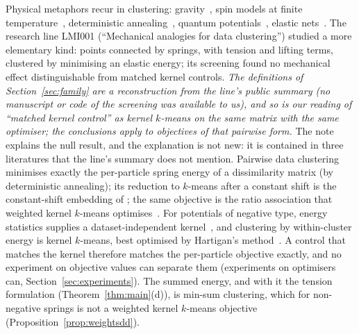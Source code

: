 \documentclass[11pt,a4paper]{article}
\theoremstyle{plain}
\theoremstyle{definition}
\theoremstyle{remark}
\begin{document}
Physical metaphors recur in clustering: gravity~\citep{wright1977}, spin models at finite temperature~\citep{blatt1996}, deterministic annealing~\citep{rose1990,rose1998}, quantum potentials~\citep{horn2002}, elastic nets~\citep{durbin1987,yuille1990}. The research line LMI001 (``Mechanical analogies for data clustering'') studied a more elementary kind: points connected by springs, with tension and lifting terms, clustered by minimising an elastic energy; its screening found no mechanical effect distinguishable from matched kernel controls. \emph{The definitions of Section~\ref{sec:family} are a reconstruction from the line's public summary (no manuscript or code of the screening was available to us), and so is our reading of ``matched kernel control'' as kernel $k$-means on the same matrix with the same optimiser; the conclusions apply to objectives of that pairwise form.} The note explains the null result, and the explanation is not new: it is contained in three literatures that the line's summary does not mention. Pairwise data clustering~\citep{hofmann1997} minimises exactly the per-particle spring energy of a dissimilarity matrix (by deterministic annealing); its reduction to $k$-means after a constant shift is the constant-shift embedding of \citet{roth2003}; the same objective is the ratio association that weighted kernel $k$-means optimises~\citep{dhillon2005tr,dhillon2007}. For potentials of negative type, energy statistics supplies a dataset-independent kernel~\citep{sejdinovic2013}, and clustering by within-cluster energy is kernel $k$-means, best optimised by Hartigan's method~\citep{franca2021}. A control that matches the kernel therefore matches the per-particle objective exactly, and no experiment on objective values can separate them (experiments on optimisers can, Section~\ref{sec:experiments}). The summed energy, and with it the tension formulation (Theorem~\ref{thm:main}(d)), is min-sum clustering, which for non-negative springs is not a weighted kernel $k$-means objective (Proposition~\ref{prop:weightsdd}).
\end{document}
